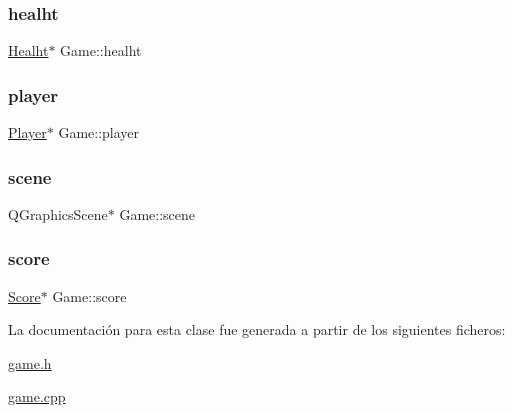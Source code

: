 \hypertarget{class_game_af7860ba10bf58b4bfed1e00f5f699755}{}\label{class_game_af7860ba10bf58b4bfed1e00f5f699755} 
\subsubsection{\texorpdfstring{healht}{healht}}
{\footnotesize\ttfamily \hyperlink{class_healht}{Healht}$\ast$ Game\+::healht}

\hypertarget{class_game_abec70aa1c0269a9a7e171af4d79e08bf}{}\label{class_game_abec70aa1c0269a9a7e171af4d79e08bf} 
\subsubsection{\texorpdfstring{player}{player}}
{\footnotesize\ttfamily \hyperlink{class_player}{Player}$\ast$ Game\+::player}

\hypertarget{class_game_a8119e3b9a632906c6808fa294b46a92a}{}\label{class_game_a8119e3b9a632906c6808fa294b46a92a} 
\subsubsection{\texorpdfstring{scene}{scene}}
{\footnotesize\ttfamily Q\+Graphics\+Scene$\ast$ Game\+::scene}

\hypertarget{class_game_ad195acc6b5ee17a5a07fea0b7b4ff5e2}{}\label{class_game_ad195acc6b5ee17a5a07fea0b7b4ff5e2} 
\subsubsection{\texorpdfstring{score}{score}}
{\footnotesize\ttfamily \hyperlink{class_score}{Score}$\ast$ Game\+::score}



La documentación para esta clase fue generada a partir de los siguientes ficheros\+:\begin{DoxyCompactItemize}
\item 
\hyperlink{game_8h}{game.\+h}\item 
\hyperlink{game_8cpp}{game.\+cpp}\end{DoxyCompactItemize}
